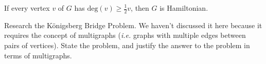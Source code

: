 \begin{theorem}[Dirac] If every vertex $v$ of $G$ has $\text{deg}(v) \geq \frac{1}{2}v$, then $G$ is Hamiltonian.
\end{theorem}

\begin{remark} Research the K\"{o}nigsberg Bridge Problem.  We haven't discussed it here because it requires the concept of multigraphs (\textit{i.e.} graphs with multiple edges between pairs of vertices).  State the problem, and justify the answer to the problem in terms of multigraphs.
\end{remark}
